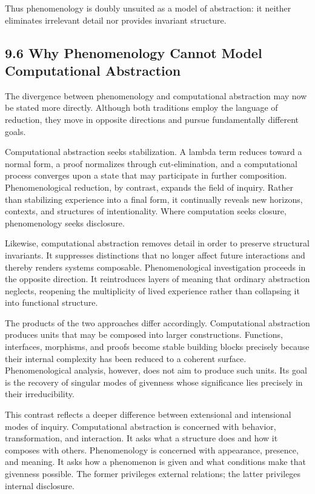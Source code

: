 \documentclass[12pt,letterpaper]{article}
\theoremstyle{remark}
\begin{document}
Thus phenomenology is doubly unsuited as a model of abstraction: it neither eliminates irrelevant detail nor provides invariant structure.

\subsection{9.6 Why Phenomenology Cannot Model Computational Abstraction}

The divergence between phenomenology and computational abstraction may now be stated more directly. Although both traditions employ the language of reduction, they move in opposite directions and pursue fundamentally different goals.

Computational abstraction seeks stabilization. A lambda term reduces toward a normal form, a proof normalizes through cut-elimination, and a computational process converges upon a state that may participate in further composition. Phenomenological reduction, by contrast, expands the field of inquiry. Rather than stabilizing experience into a final form, it continually reveals new horizons, contexts, and structures of intentionality. Where computation seeks closure, phenomenology seeks disclosure.

Likewise, computational abstraction removes detail in order to preserve structural invariants. It suppresses distinctions that no longer affect future interactions and thereby renders systems composable. Phenomenological investigation proceeds in the opposite direction. It reintroduces layers of meaning that ordinary abstraction neglects, reopening the multiplicity of lived experience rather than collapsing it into functional structure.

The products of the two approaches differ accordingly. Computational abstraction produces units that may be composed into larger constructions. Functions, interfaces, morphisms, and proofs become stable building blocks precisely because their internal complexity has been reduced to a coherent surface. Phenomenological analysis, however, does not aim to produce such units. Its goal is the recovery of singular modes of givenness whose significance lies precisely in their irreducibility.

This contrast reflects a deeper difference between extensional and intensional modes of inquiry. Computational abstraction is concerned with behavior, transformation, and interaction. It asks what a structure does and how it composes with others. Phenomenology is concerned with appearance, presence, and meaning. It asks how a phenomenon is given and what conditions make that givenness possible. The former privileges external relations; the latter privileges internal disclosure.
\end{document}
